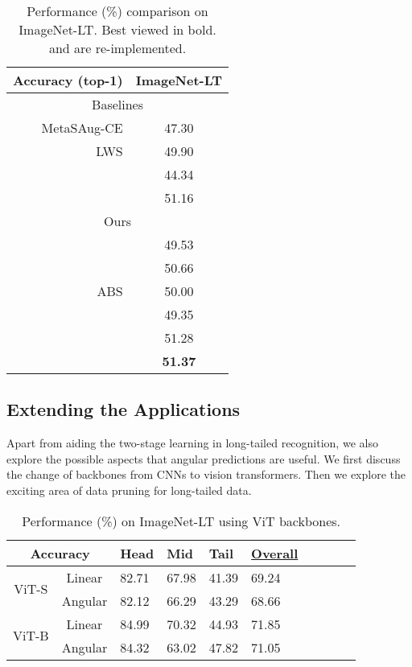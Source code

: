 \documentclass[10pt,twocolumn,letterpaper]{article}
\begin{document}
\begin{table}[tb!]
\centering
\caption{Performance (\%) comparison on ImageNet-LT. Best viewed in bold.  and  are re-implemented.}\vspace{-5pt}
\begin{tabular}{rc}
\hline
Accuracy (top-1) & ImageNet-LT \\ \hline \hline
\multicolumn{2}{c}{Baselines}        \\ \hline
MetaSAug-CE \cite{metasaug} &  47.30  \\
LWS \cite{decoupling}       &  49.90  \\
~\cite{mislas}     &  44.34  \\
~\cite{mislas}     &  51.16   \\ \hline \hline
\multicolumn{2}{c}{Ours}        \\ \hline
    &   49.53  \\ 
    &   50.66  \\ \hline
ABS       &   50.00  \\  \hline
       &   49.35  \\ 
     &   51.28  \\ 
 &  \textbf{51.37}   \\ \hline
\end{tabular}
\label{tab:imagenet_baseline}
\end{table}


\subsection{Extending the Applications}
Apart from aiding the two-stage learning in long-tailed recognition, we also explore the possible aspects that angular predictions are useful. We first discuss the change of backbones from CNNs to vision transformers. Then we explore the exciting area of data pruning for long-tailed data.

\begin{table}[tb!]
\centering
\caption{Performance (\%) on ImageNet-LT using ViT backbones.}\vspace{-5pt}
\begin{tabular}{c|c|llllllll}
\hline
\multicolumn{2}{c}{Accuracy} & Head & Mid & Tail & \underline{Overall} \\ \hline \hline
\multirow{2}{*}{ViT-S} & Linear & 82.71 & 67.98 & 41.39 & 69.24   \\
   & Angular & 82.12 & 66.29 & 43.29  & 68.66   \\ \hline 
\multirow{2}{*}{ViT-B} & Linear & 84.99 & 70.32 & 44.93 & 71.85  \\ 
    & Angular & 84.32 &  63.02 &  47.82  & 71.05  \\ \hline
\end{tabular}
\label{tab:vit}
\end{table}
\end{document}
